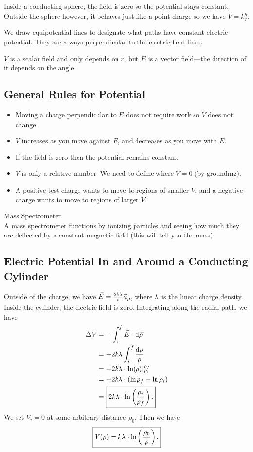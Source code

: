 \documentclass[class=article, crop=false]{standalone}
\begin{document}
  Inside a conducting sphere, the field is zero so the potential stays constant. Outside the sphere however, it behaves just like a point charge so we have $V = k\frac{q}{r}$. \par
  We draw equipotential lines to designate what paths have constant electric potential. They are always perpendicular to the electric field lines.
  \begin{note}{}
    $V$ is a scalar field and only depends on $r$, but $E$ is a vector field---the direction of it depends on the angle.
  \end{note}
  \subsection{General Rules for Potential}
  \begin{itemize}
    \item Moving a charge perpendicular to $E$ does not require work so $V$ does not change.
    \item $V$ increases as you move against $E$, and decreases as you move with $E$.
    \item If the field is zero then the potential remains constant.
    \item $V$ is only a relative number. We need to define where $V = 0$ (by grounding).
    \item A positive test charge wants to move to regions of smaller $V$, and a negative charge wants to move to regions of larger $V$.
  \end{itemize}
  \begin{example}{Mass Spectrometer} \\
    A mass spectrometer functions by ionizing particles and seeing how much they are deflected by a constant magnetic field (this will tell you the mass).
  \end{example}
  \subsection{Electric Potential In and Around a Conducting Cylinder}
  Outside of the charge, we have $\vec{E} = \frac{2k\lambda}{\rho}\vec{a}_\rho$, where $\lambda$ is the linear charge density. Inside the cylinder, the electric field is zero. Integrating along the radial path, we have
  \begin{align*}
    \Delta V &= -\int_{i}^{f}\vec{E}\cdot  \,\mathrm{d}\vec{\rho} \\
             &= -2k\lambda\int_{i}^{f}\frac{\mathrm{d}\rho}{\rho} \\
             &= -2k\lambda\cdot \ln(\rho)|_{\rho_i}^{\rho_f} \\
             &= -2k\lambda\cdot (\ln \rho_f - \ln\rho_i) \\
             &= \boxed{2k\lambda\cdot \ln \left( \frac{\rho_i}{\rho_f} \right).}
  \end{align*}
  We set $V_i = 0$ at some arbitrary distance $\rho_0$. Then we have
  \[
    \boxed{V(\rho) = k\lambda\cdot \ln \left( \frac{\rho_0}{\rho} \right).}
  \]
\end{document}
